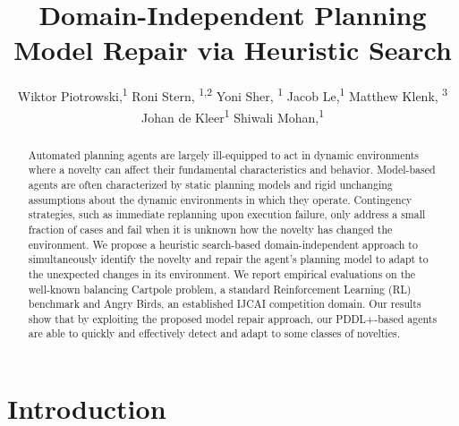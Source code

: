 \documentclass[letterpaper]{article} %
\title{Domain-Independent Planning Model Repair via Heuristic Search}
\author {
    Wiktor Piotrowski,\textsuperscript{\rm 1}
    Roni Stern, \textsuperscript{\rm 1,2}
    Yoni Sher, \textsuperscript{\rm 1}
    Jacob Le,\textsuperscript{\rm 1}
    Matthew Klenk, \textsuperscript{\rm 3}
    Johan de Kleer\textsuperscript{\rm 1}
    Shiwali Mohan,\textsuperscript{\rm 1}
}
\begin{document}
\maketitle

\begin{abstract}
Automated planning agents are largely ill-equipped to act in dynamic environments where a novelty can affect their fundamental characteristics and behavior.
Model-based agents are often characterized by static planning models and rigid unchanging assumptions about the dynamic environments in which they operate. Contingency strategies, such as immediate replanning upon execution failure, only address a small fraction of cases and fail when it is unknown how the novelty has changed the environment. We propose a heuristic search-based domain-independent approach to simultaneously identify the novelty and repair the agent's planning model to adapt to the unexpected changes in its environment. We report empirical evaluations on the well-known balancing Cartpole problem, a standard Reinforcement Learning (RL) benchmark and Angry Birds, an established IJCAI competition domain. Our results show that by exploiting the proposed model repair approach, our PDDL+-based agents are able to quickly and effectively detect and adapt to some classes of novelties.
\end{abstract}

\section{Introduction}


\end{document}
